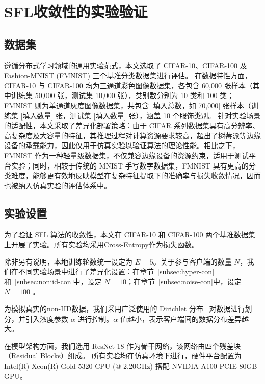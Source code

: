 \section{SFL收敛性的实验验证}
\subsection{数据集}
遵循分布式学习领域的通用实验范式，本文选取了 CIFAR-10、CIFAR-100 及 Fashion-MNIST (FMNIST) 三个基准分类数据集进行评估。
在数据特性方面，CIFAR-10 与 CIFAR-100 均为三通道彩色图像数据集，各包含 60,000 张样本（其中训练集 50,000 张，测试集 10,000 张），类别数分别为 10 类和 100 类；FMNIST 则为单通道灰度图像数据集，共包含 [填入总数，如 70,000] 张样本（训练集 [填入数量] 张，测试集 [填入数量] 张），涵盖 10 个服饰类别。
针对实验场景的适配性，本文采取了差异化部署策略：由于 CIFAR 系列数据集具有高分辨率、高复杂度及大容量的特征，其推理过程对计算资源要求较高，超出了树莓派等边缘设备的承载能力，因此仅用于仿真实验以验证算法的理论性能。相比之下，FMNIST 作为一种轻量级数据集，不仅兼容边缘设备的资源约束，适用于测试平台实验；同时，相较于传统的 MNIST 手写数字数据集，FMNIST 具有更高的分类难度，能够更有效地反映模型在复杂特征提取下的准确率与损失收敛情况，因而也被纳入仿真实验的评估体系中。

\subsection{实验设置}

为了验证 SFL 算法的收敛性，本文在 CIFAR-10 和 CIFAR-100 两个基准数据集上开展了实验。所有实验均采用Cross-Entropy作为损失函数。

除非另有说明，本地训练轮数统一设定为 $E=5$。关于参与客户端的数量 $N$，我们在不同实验场景中进行了差异化设置：在章节~\ref{subsec:hyper-con}和~\ref{subsec:noniid-con}中，设定 $N=10$；在章节~\ref{subsec:noise-con}中，设定 $N=100$ 。

为模拟真实的non-IID数据，我们采用广泛使用的 Dirichlet 分布~\cite{hsu2019measuring} 对数据进行划分，并引入浓度参数 $\alpha$ 进行控制。$\alpha$ 值越小，表示客户端间的数据分布差异越大。

在模型架构方面，我们选用 ResNet-18 作为骨干网络，该网络由四个残差块（Residual Blocks）组成。
所有实验均在仿真环境下进行，硬件平台配置为 Intel(R) Xeon(R) Gold 5320 CPU (@ 2.20GHz) 搭配 NVIDIA A100-PCIE-80GB GPU。
